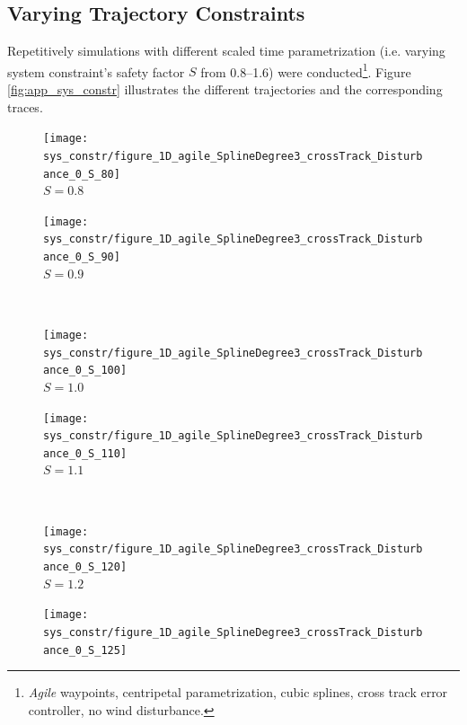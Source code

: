 \subsection{Varying Trajectory Constraints}
\label{sub:app_varying_sys_constraints}
Repetitively simulations with different scaled time parametrization (i.e. varying system constraint's safety factor $S$ from \numrange{0.8}{1.6}) were conducted\footnote{\textit{Agile} waypoints, centripetal parametrization, cubic splines, cross track error controller, no wind disturbance.}. Figure \ref{fig:app_sys_constr} illustrates the different trajectories and the corresponding traces.

\begin{figure}[h]
  \centering
  \begin{minipage}[t]{0.48\textwidth}
    \centering
    \texttt{[image: sys\_constr/figure\_1D\_agile\_SplineDegree3\_crossTrack\_Disturbance\_0\_S\_80]}
  \\ $S=0.8$
  \end{minipage}
  \begin{minipage}[t]{0.48\textwidth}
    \centering
    \texttt{[image: sys\_constr/figure\_1D\_agile\_SplineDegree3\_crossTrack\_Disturbance\_0\_S\_90]}
  \\ $S=0.9$
  \end{minipage} \\ \hspace{5pt}
  \begin{minipage}[t]{0.48\textwidth}
    \centering
    \texttt{[image: sys\_constr/figure\_1D\_agile\_SplineDegree3\_crossTrack\_Disturbance\_0\_S\_100]}
  \\ $S=1.0$
  \end{minipage}
  \begin{minipage}[t]{0.48\textwidth}
    \centering
    \texttt{[image: sys\_constr/figure\_1D\_agile\_SplineDegree3\_crossTrack\_Disturbance\_0\_S\_110]}
  \\ $S=1.1$
  \end{minipage}\\ \hspace{5pt}
  \begin{minipage}[t]{0.48\textwidth}
    \centering
    \texttt{[image: sys\_constr/figure\_1D\_agile\_SplineDegree3\_crossTrack\_Disturbance\_0\_S\_120]}
  \\ $S=1.2$
  \end{minipage}
  \begin{minipage}[t]{0.48\textwidth}
    \centering
    \texttt{[image: sys\_constr/figure\_1D\_agile\_SplineDegree3\_crossTrack\_Disturbance\_0\_S\_125]}

\end{minipage}
\end{figure}
